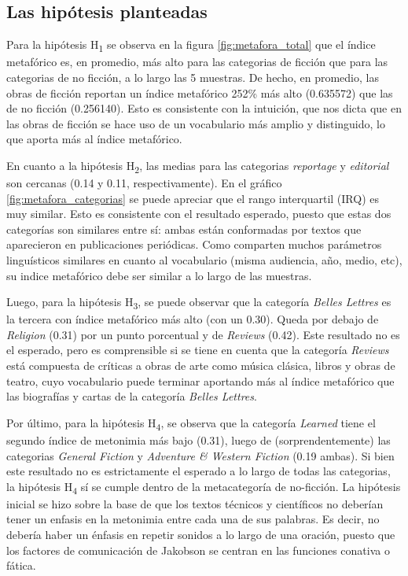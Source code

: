 \documentclass[12pt,letterpaper,twoside]{article}
\begin{document}
\subsection{Las hipótesis planteadas}
\label{sec:org8e2c55c}

Para la hipótesis H\textsubscript{1} se observa en la figura
\ref{fig:metafora_total} que el índice metafórico es, en promedio, más
alto para las categorias de ficción que para las categorias de no
ficción, a lo largo las 5 muestras. De hecho, en promedio, las obras
de ficción reportan un índice metafórico 252\% más alto (0.635572) que
las de no ficción (0.256140). Esto es consistente con la intuición,
que nos dicta que en las obras de ficción se hace uso de un
vocabulario más amplio y distinguido, lo que aporta más al índice
metafórico.

En cuanto a la hipótesis H\textsubscript{2}, las medias para las categorias
\emph{reportage} y \emph{editorial} son cercanas (0.14 y 0.11,
respectivamente). En el gráfico \ref{fig:metafora_categorias} se puede
apreciar que el rango interquartil (IRQ) es muy similar. Esto es
consistente con el resultado esperado, puesto que estas dos categorías
son similares entre sí: ambas están conformadas por textos que
aparecieron en publicaciones periódicas. Como comparten muchos
parámetros linguísticos similares en cuanto al vocabulario (misma
audiencia, año, medio, etc), su indice metafórico debe ser similar a
lo largo de las muestras.

Luego, para la hipótesis H\textsubscript{3}, se puede observar que la categoría
\emph{Belles Lettres} es la tercera con índice metafórico más alto
(con un 0.30). Queda por debajo de \emph{Religion} (0.31) por un punto porcentual y de
\emph{Reviews} (0.42). Este resultado no es el esperado, pero es
comprensible si se tiene en cuenta que la categoría \emph{Reviews} está
compuesta de críticas a obras de arte como música clásica, libros y
obras de teatro, cuyo vocabulario puede terminar aportando más al
índice metafórico que las biografías y cartas de la categoría \emph{Belles
Lettres}.

Por último, para la hipótesis H\textsubscript{4}, se observa que la categoría
\emph{Learned} tiene el segundo índice de metonimia más bajo (0.31), luego
de (sorprendentemente) las categorias \emph{General Fiction} y \emph{Adventure \&
Western Fiction} (0.19 ambas). Si bien este resultado no es
estrictamente el esperado a lo largo de todas las categorias, la
hipótesis H\textsubscript{4} sí se cumple dentro de la metacategoría de
no-ficción. La hipótesis inicial se hizo sobre la base de que los
textos técnicos y científicos no deberían tener un enfasis en la
metonimia entre cada una de sus palabras.  Es decir, no debería haber
un énfasis en repetir sonidos a lo largo de una oración, puesto que
los factores de comunicación de Jakobson se centran en las funciones
conativa o fática.
\end{document}
